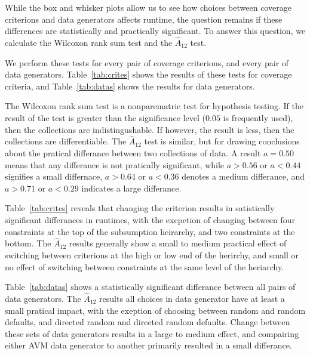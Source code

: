 
While the box and whisker plots allow us to see how choices between coverage criterions and data generators affects
runtime, the question remains if these differences are statistically and practically significant. To answer this
question, we calculate the Wilcoxon rank sum test and the $\hat{A}_{12}$ test.

We perform these tests for every pair of coverage criterions, and every pair of data generators.  Table~\ref{tab:crites}
shows the results of these tests for coverage criteria, and Table~\ref{tab:datas} shows the results for data generators.

The Wilcoxon rank sum test is a nonparematric test for hypothesis
testing.  If the result of the test is greater than the significance
level ($0.05$ is frequently used), then the collections are
indistingushable.  If however, the result is less, then the collections
are differentiable.  The $\hat{A}_{12}$ test is similar, but for drawing
conclusions about the pratical differance between two collections of
data.  A result $a=0.5$0 means that any differance is not pratically
significant, while $a>0.56$ or $a<0.44$ signifies a small differnace,
$a>0.64$ or $a<0.36$ denotes a medium differance, and $a>0.71$ or
$a<0.29$ indicates a large differance. 

Table~\ref{tab:crites} reveals that changing the criterion results in
satistically significant differances in runtimes, with the excpetion of
changing between four constraints at the top of the subsumption
heirarchy, and two constraints at the bottom.  The $\hat{A}_{12}$
results generally show a small to medium practical effect of switching
between criterions at the high or low end of the herirchy, and small or
no effect of switching between constraints at the same level of the
heriarchy.

Table~\ref{tab:datas} shows a statistically significant differance
between all pairs of data generators. The $\hat{A}_{12}$ results all
choices in data generator have at least a small pratical impact, with
the exeption of choosing between random and random defaults, and
directed random and directed random defaults.  Change between these sets
of data generators results in a large to medium effect, and compairing
either AVM data generator to another primarily resulted in a small
differance.


